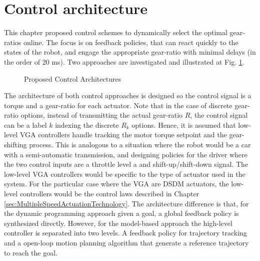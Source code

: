 \newpage

\section{Control architecture}
\label{sec:arch}

This chapter proposed control schemes to dynamically select the optimal gear-ratios online. The focus is on feedback policies, that can react quickly to the states of the robot, and engage the appropriate gear-ratio with minimal delays (in the order of 20 ms). Two approaches are investigated and illustrated at Fig. \ref{fig:controlarchitectures}. 
%
\begin{figure}[H]
				\vspace{-10pt}
        \centering
				\hspace{+10pt}
        \caption{Proposed Control Architectures}
				\label{fig:controlarchitectures}
\end{figure}
%
The architecture of both control approaches is designed so the control signal is a torque and a gear-ratio for each actuator. Note that in the case of discrete gear-ratio options, instead of transmitting the actual gear-ratio $R$, the control signal can be a label $k$ indexing the discrete $R_k$ options. Hence, it is assumed that low-level VGA controllers handle tracking the motor torque setpoint and the gear-shifting process. This is analogous to a situation where the robot would be a car with a semi-automatic transmission, and designing policies for the driver where the two control inputs are a throttle level a and shift-up/shift-down signal. The low-level VGA controllers would be specific to the type of actuator used in the system. For the particular case where the VGA are DSDM actuators, the low-level controllers would be the control laws described in Chapter \ref{sec:MultipleSpeedActuationTechnology}. The architecture difference is that, for the dynamic programming approach given a goal, a global feedback policy is synthesized directly. However, for the model-based approach the high-level controller is separated into two levels. A feedback policy for trajectory tracking and a open-loop motion planning algorithm that generate a reference trajectory to reach the goal. 

